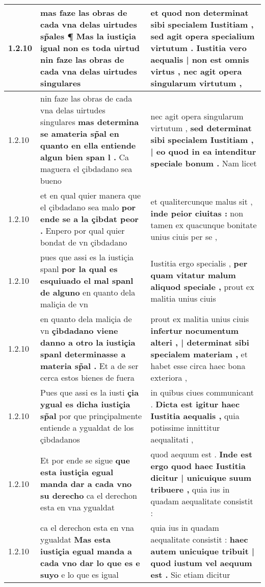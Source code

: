 \begin{tabular}{|p{1cm}|p{6.5cm}|p{6.5cm}|}
1.2.10 & mas faze las obras de cada vna delas uirtudes sp̃ales ¶ \textbf{ Mas la iustiçia igual non es toda uirtud } nin faze las obras de cada vna delas uirtudes singulares & et quod non determinat sibi specialem Iustitiam , sed agit opera specialium virtutum . \textbf{ Iustitia vero aequalis | non est omnis virtus , } nec agit opera singularum virtutum , \\\hline
1.2.10 & nin faze las obras de cada vna delas uirtudes singulares \textbf{ mas determina se amateria sp̃al en quanto en ella entiende algun bien span l . } Ca maguera el çibdadano sea bueno & nec agit opera singularum virtutum , \textbf{ sed determinat sibi specialem Iustitiam , | eo quod in ea intenditur speciale bonum . } Nam licet \\\hline
1.2.10 & et en qual quier manera que el çibdadano sea malo \textbf{ por ende se a la çibdat peor . } Enpero por qual quier bondat de vn çibdadano & et qualitercunque malus sit , \textbf{ inde peior ciuitas : } non tamen ex quacunque bonitate unius ciuis per se , \\\hline
1.2.10 & pues que assi es la iustiçia spanl \textbf{ por la qual es esquiuado el mal spanl de alguno } en quanto dela maliçia de vn & Iustitia ergo specialis , \textbf{ per quam vitatur malum aliquod speciale , } prout ex malitia unius ciuis \\\hline
1.2.10 & en quanto dela maliçia de vn \textbf{ çibdadano viene danno a otro la iustiçia spanl determinasse a materia sp̃al . } Et a de ser cerca estos bienes de fuera & prout ex malitia unius ciuis \textbf{ infertur nocumentum alteri , | determinat sibi specialem materiam , } et habet esse circa haec bona exteriora , \\\hline
1.2.10 & Pues que assi es la iusti \textbf{ çia ygual es dicha iustiçia sp̃al } por que prinçipalmente entiende a ygualdat de los çibdadanos & in quibus ciues communicant . \textbf{ Dicta est igitur haec Iustitia aequalis , } quia potissime innittitur aequalitati , \\\hline
1.2.10 & Et por ende se sigue \textbf{ que esta iustiçia egual manda dar a cada vno su derecho } ca el derechon esta en vna ygualdat & quod aequum est . \textbf{ Inde est ergo quod haec Iustitia dicitur | unicuique suum tribuere , } quia ius in quadam aequalitate consistit : \\\hline
1.2.10 & ca el derechon esta en vna ygualdat \textbf{ Mas esta iustiçia egual manda a cada vno dar lo que es e suyo } e lo que es igual & quia ius in quadam aequalitate consistit : \textbf{ haec autem unicuique tribuit | quod iustum vel aequum est . } Sic etiam dicitur \\\hline

\end{tabular}
